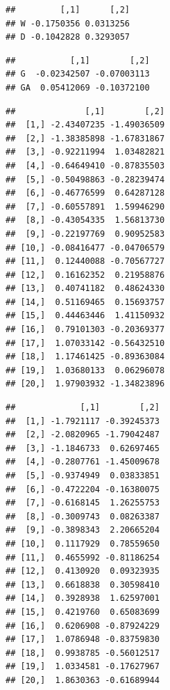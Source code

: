 \documentclass[]{book}
\newenvironment{Shaded}{\begin{snugshade}}{\end{snugshade}}
\newcommand{\CommentTok}[1]{\textcolor[rgb]{0.56,0.35,0.01}{\textit{#1}}}
\newcommand{\NormalTok}[1]{#1}
\newcommand{\OperatorTok}[1]{\textcolor[rgb]{0.81,0.36,0.00}{\textbf{#1}}}
\theoremstyle{definition}
\theoremstyle{definition}
\theoremstyle{definition}
\theoremstyle{remark}
\begin{document}
\begin{verbatim}
##         [,1]      [,2]
## W -0.1750356 0.0313256
## D -0.1042828 0.3293057
\end{verbatim}

\begin{Shaded}
\end{Shaded}

\begin{verbatim}
##           [,1]        [,2]
## G  -0.02342507 -0.07003113
## GA  0.05412069 -0.10372100
\end{verbatim}

\begin{Shaded}
\end{Shaded}

\begin{verbatim}
##              [,1]        [,2]
##  [1,] -2.43407235 -1.49036509
##  [2,] -1.38385898 -1.67831867
##  [3,] -0.92211994  1.03482821
##  [4,] -0.64649410 -0.87835503
##  [5,] -0.50498863 -0.28239474
##  [6,] -0.46776599  0.64287128
##  [7,] -0.60557891  1.59946290
##  [8,] -0.43054335  1.56813730
##  [9,] -0.22197769  0.90952583
## [10,] -0.08416477 -0.04706579
## [11,]  0.12440088 -0.70567727
## [12,]  0.16162352  0.21958876
## [13,]  0.40741182  0.48624330
## [14,]  0.51169465  0.15693757
## [15,]  0.44463446  1.41150932
## [16,]  0.79101303 -0.20369377
## [17,]  1.07033142 -0.56432510
## [18,]  1.17461425 -0.89363084
## [19,]  1.03680133  0.06296078
## [20,]  1.97903932 -1.34823896
\end{verbatim}

\begin{Shaded}
\end{Shaded}

\begin{verbatim}
##             [,1]        [,2]
##  [1,] -1.7921117 -0.39245373
##  [2,] -2.0820965 -1.79042487
##  [3,] -1.1846733  0.62697465
##  [4,] -0.2807761 -1.45009678
##  [5,] -0.9374949  0.03833851
##  [6,] -0.4722204 -0.16380075
##  [7,] -0.6168145  1.26255753
##  [8,] -0.3009743  0.08263387
##  [9,] -0.3898343  2.20665204
## [10,]  0.1117929  0.78559650
## [11,]  0.4655992 -0.81186254
## [12,]  0.4130920  0.09323935
## [13,]  0.6618838  0.30598410
## [14,]  0.3928938  1.62597001
## [15,]  0.4219760  0.65083699
## [16,]  0.6206908 -0.87924229
## [17,]  1.0786948 -0.83759830
## [18,]  0.9938785 -0.56012517
## [19,]  1.0334581 -0.17627967
## [20,]  1.8630363 -0.61689944
\end{verbatim}
\end{document}
